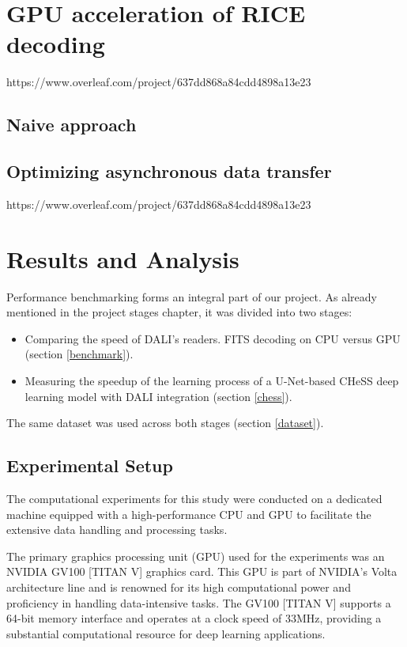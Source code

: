 \documentclass[licencjacka,en]{pracamgr}
\begin{document}
\chapter{GPU acceleration of RICE decoding}https://www.overleaf.com/project/637dd868a84cdd4898a13e23
\section{Naive approach}
\section{Optimizing asynchronous data transfer}https://www.overleaf.com/project/637dd868a84cdd4898a13e23

\chapter{Results and Analysis}

Performance benchmarking forms an integral part of our project. As already mentioned in the project stages chapter, it was divided into two
stages:
\begin{itemize}
    \item Comparing the speed of DALI's readers. FITS decoding on CPU versus GPU (section \ref{benchmark}).
    \item Measuring the speedup of the learning process of a U-Net-based CHeSS deep learning model \cite{CHeSS} with DALI integration (section \ref{chess}).
\end{itemize}

The same dataset \cite{sdo} was used across both stages (section \ref{dataset}).

\section{Experimental Setup}

The computational experiments for this study were conducted on a dedicated machine equipped with a high-performance CPU and GPU to facilitate the extensive data handling and processing tasks.

The primary graphics processing unit (GPU) used for the experiments was an NVIDIA GV100 [TITAN V] graphics card. This GPU is part of NVIDIA's Volta architecture line and is renowned for its high computational power and proficiency in handling data-intensive tasks. The GV100 [TITAN V] supports a 64-bit memory interface and operates at a clock speed of 33MHz, providing a substantial computational resource for deep learning applications.
\end{document}

